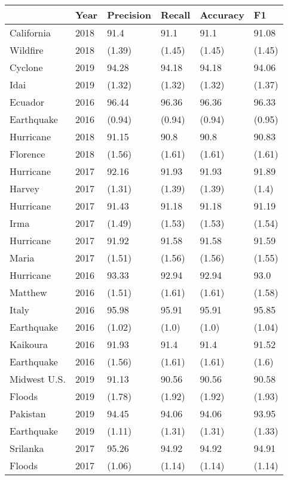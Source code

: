 \begin{tabular}{llllll}
\toprule
{} &  Year & Precision &  Recall & Accuracy &      F1 \\
\midrule
California &  2018 &      91.4 &    91.1 &     91.1 &   91.08 \\
Wildfire                     &  2018 &    (1.39) &  (1.45) &   (1.45) &  (1.45) \\
Cyclone          &  2019 &     94.28 &   94.18 &    94.18 &   94.06 \\
 Idai                    &  2019 &    (1.32) &  (1.32) &   (1.32) &  (1.37) \\
Ecuador    &  2016 &     96.44 &   96.36 &    96.36 &   96.33 \\
 Earthquake                    &  2016 &    (0.94) &  (0.94) &   (0.94) &  (0.95) \\
Hurricane    &  2018 &     91.15 &    90.8 &     90.8 &   90.83 \\
 Florence                    &  2018 &    (1.56) &  (1.61) &   (1.61) &  (1.61) \\
Hurricane      &  2017 &     92.16 &   91.93 &    91.93 &   91.89 \\
 Harvey                    &  2017 &    (1.31) &  (1.39) &   (1.39) &   (1.4) \\
Hurricane        &  2017 &     91.43 &   91.18 &    91.18 &   91.19 \\
 Irma                    &  2017 &    (1.49) &  (1.53) &   (1.53) &  (1.54) \\
Hurricane       &  2017 &     91.92 &   91.58 &    91.58 &   91.59 \\
 Maria                    &  2017 &    (1.51) &  (1.56) &   (1.56) &  (1.55) \\
Hurricane     &  2016 &     93.33 &   92.94 &    92.94 &    93.0 \\
 Matthew                    &  2016 &    (1.51) &  (1.61) &   (1.61) &  (1.58) \\
Italy &  2016 &     95.98 &   95.91 &    95.91 &   95.85 \\
 Earthquake                    &  2016 &    (1.02) &   (1.0) &    (1.0) &  (1.04) \\
Kaikoura   &  2016 &     91.93 &    91.4 &     91.4 &   91.52 \\
 Earthquake                    &  2016 &    (1.56) &  (1.61) &   (1.61) &   (1.6) \\
Midwest U.S. &  2019 &     91.13 &   90.56 &    90.56 &   90.58 \\
Floods                    &  2019 &    (1.78) &  (1.92) &   (1.92) &  (1.93) \\
Pakistan   &  2019 &     94.45 &   94.06 &    94.06 &   93.95 \\
 Earthquake                    &  2019 &    (1.11) &  (1.31) &   (1.31) &  (1.33) \\
Srilanka       &  2017 &     95.26 &   94.92 &    94.92 &   94.91 \\
 Floods                    &  2017 &    (1.06) &  (1.14) &   (1.14) &  (1.14) \\
\bottomrule
\end{tabular}
